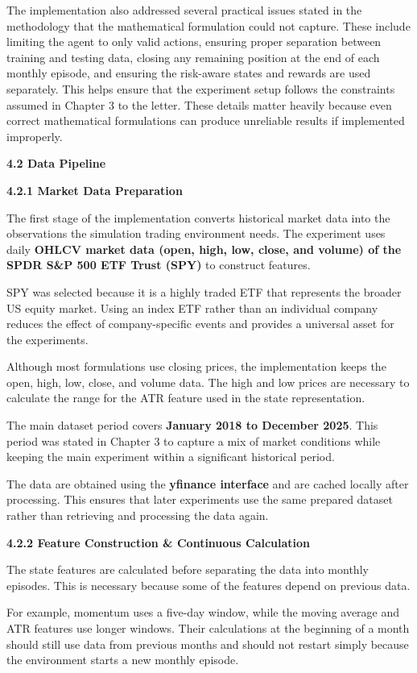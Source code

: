 The implementation also addressed several practical issues stated in the
methodology that the mathematical formulation could not capture. These
include limiting the agent to only valid actions, ensuring proper
separation between training and testing data, closing any remaining
position at the end of each monthly episode, and ensuring the risk-aware
states and rewards are used separately. This helps ensure that the
experiment setup follows the constraints assumed in Chapter 3 to the
letter. These details matter heavily because even correct mathematical
formulations can produce unreliable results if implemented improperly.

\textbf{4.2 Data Pipeline}

\textbf{4.2.1 Market Data Preparation}

The first stage of the implementation converts historical market data
into the observations the simulation trading environment needs. The
experiment uses daily \textbf{OHLCV market data (open, high, low, close,
and volume) of the SPDR S\&P 500 ETF Trust (SPY)} to construct features.

SPY was selected because it is a highly traded ETF that represents the
broader US equity market. Using an index ETF rather than an individual
company reduces the effect of company-specific events and provides a
universal asset for the experiments.

Although most formulations use closing prices, the implementation keeps
the open, high, low, close, and volume data. The high and low prices are
necessary to calculate the range for the ATR feature used in the state
representation.

The main dataset period covers \textbf{January 2018 to December 2025}.
This period was stated in Chapter 3 to capture a mix of market
conditions while keeping the main experiment within a significant
historical period.

The data are obtained using the \textbf{yfinance interface} and are
cached locally after processing. This ensures that later experiments use
the same prepared dataset rather than retrieving and processing the data
again.

\textbf{4.2.2 Feature Construction \& Continuous Calculation}

The state features are calculated before separating the data into
monthly episodes. This is necessary because some of the features depend
on previous data.

For example, momentum uses a five-day window, while the moving average
and ATR features use longer windows. Their calculations at the beginning
of a month should still use data from previous months and should not
restart simply because the environment starts a new monthly episode.

